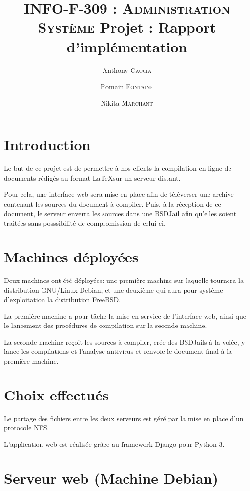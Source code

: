\documentclass[10pt,a4paper]{article}
\author{Anthony \textsc{Caccia} \and Romain \textsc{Fontaine} \and Nikita \textsc{Marchant} }
\date{}
\title{\textsc{INFO-F-309 : Administration Système} Projet : Rapport d'implémentation}
\begin{document}
\maketitle

\section{Introduction}
\label{sec:Introduction}

Le but de ce projet est de permettre à nos clients la compilation en ligne de documents rédigés au format \LaTeX sur un serveur distant.

Pour cela, une interface web sera mise en place afin de téléverser une archive contenant les sources du document à compiler. Puis, à la réception de ce document, le serveur enverra les sources dans une BSDJail afin qu'elles soient traitées sans posssibilité de compromission de celui-ci.

\section{Machines déployées}
\label{sec:Machines déployées}

Deux machines ont été déployées: une première machine sur laquelle tournera la distribution GNU/Linux Debian, et une deuxième qui aura pour système d'exploitation la distribution FreeBSD.

La première machine a pour tâche la mise en service de l'interface web, ainsi que le lancement des procédures de compilation sur la seconde machine.

La seconde machine reçoit les sources à compiler, crée des BSDJails à la volée, y lance les compilations et l'analyse antivirus et renvoie le document final à la première machine.

\section{Choix effectués}
\label{sec:Choix effectués}

Le partage des fichiers entre les deux serveurs est géré par la mise en place d'un protocole NFS.

L'application web est réalisée grâce au framework Django pour Python 3.



\section{Serveur web (Machine Debian)}
\end{document}
